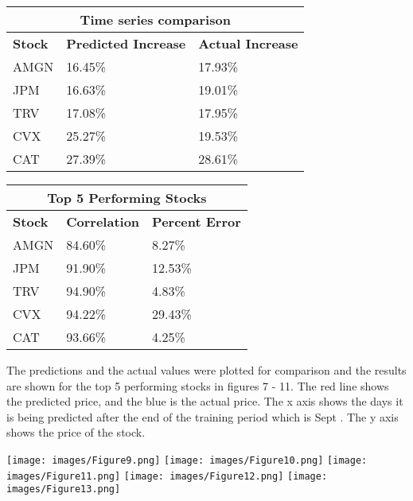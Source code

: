 \documentclass[12pt,a4paper, twoside]{article}
\begin{document}
\begin{multicols}{2}
\begin{center}
\begin{tabular}{ | p{1.5cm} |p{2cm}| p{2cm}|}
\hline
\multicolumn{3}{|c|}{\textbf{Time series comparison}} \\
\hline
\textbf{Stock} & \textbf{Predicted Increase} & \textbf{Actual Increase}\\
\hline
AMGN & 16.45\% & 17.93\%\\
JPM & 16.63\% & 19.01\%\\
TRV & 17.08\% & 17.95\% \\
CVX & 25.27\% & 19.53\%\\
CAT & 27.39\% & 28.61\%\\
\hline
\end{tabular}
\end{center}

\begin{center}
\begin{tabular}{ | p{1.5cm} |p{2.5cm}| p{2cm}|}
\hline
\multicolumn{3}{|c|}{\textbf{Top 5 Performing Stocks}} \\
\hline
\textbf{Stock} & \textbf{Correlation} & \textbf{Percent Error}\\
\hline
AMGN & 84.60\% & 8.27\%\\
JPM & 91.90\% & 12.53\%\\
TRV & 94.90\% & 4.83\% \\
CVX & 94.22\% & 29.43\%\\
CAT & 93.66\% & 4.25\%\\
\hline
\end{tabular}
\end{center}


 
The predictions and the actual values were plotted for comparison and the results are shown for the top 5 performing stocks in figures 7 - 11. The red line shows the predicted price, and the blue is the actual price. The x axis shows the days it is being predicted after the end of the training period which is Sept . The y axis shows the price of the stock.
\hspace{10 cm}
\begin{center}
    \texttt{[image: images/Figure9.png]}
    \vspace{0.25cm}
    \texttt{[image: images/Figure10.png]}
    \vspace{0.25cm}
    \texttt{[image: images/Figure11.png]}
    \vspace{0.25cm}
    \texttt{[image: images/Figure12.png]}
    \vspace{0.25cm}
    \texttt{[image: images/Figure13.png]}
    \vspace{0.25cm}


\end{center}
\end{multicols}
\end{document}
